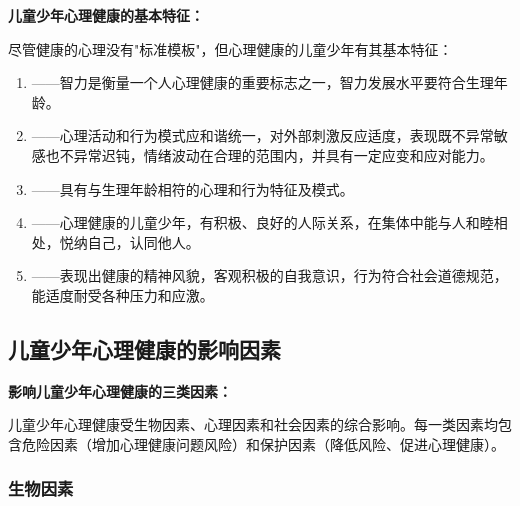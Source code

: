 \begin{keybox}
\textbf{儿童少年心理健康的基本特征：}

尽管健康的心理没有"标准模板"，但心理健康的儿童少年有其基本特征：

\begin{enumerate}[leftmargin=*]
    \item {}——智力是衡量一个人心理健康的重要标志之一，智力发展水平要符合生理年龄。

    \item {}——心理活动和行为模式应和谐统一，对外部刺激反应适度，表现既不异常敏感也不异常迟钝，情绪波动在合理的范围内，并具有一定应变和应对能力。

    \item {}——具有与生理年龄相符的心理和行为特征及模式。

    \item {}——心理健康的儿童少年，有积极、良好的人际关系，在集体中能与人和睦相处，悦纳自己，认同他人。

    \item {}——表现出健康的精神风貌，客观积极的自我意识，行为符合社会道德规范，能适度耐受各种压力和应激。
\end{enumerate}
\end{keybox}

\subsection{儿童少年心理健康的影响因素}

\begin{keybox}
\textbf{影响儿童少年心理健康的三类因素：}

儿童少年心理健康受生物因素、心理因素和社会因素的综合影响。每一类因素均包含危险因素（增加心理健康问题风险）和保护因素（降低风险、促进心理健康）。
\end{keybox}

\subsubsection{生物因素}

